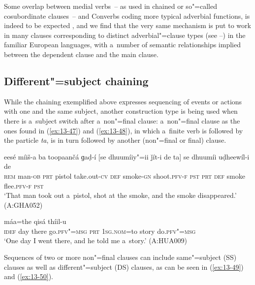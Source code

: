 Some overlap between medial verbs~-- as used in chained or so"=called cosubordinate clauses~-- and Converbs coding more typical adverbial functions, is indeed to be expected \citep[26]{haspelmath1995}, and we find that the very same mechanism is put to work in many clauses corresponding to distinct adverbial"=clause types (see --) in the familiar European languages, with a~number of semantic relationships implied between the dependent clause and the main clause. 


\subsection{Different"=subject chaining}
\label{subsec:13-3-2}


While the chaining exemplified above expresses sequencing of events or actions with one and the same subject, another construction type is being used when there is a~subject switch after a~non"=final clause: a~non"=final clause as the ones found in (\ref{ex:13-47}) and (\ref{ex:13-48}), in which a~finite verb is followed by the particle \textit{ta}, is in turn followed by another (non"=final or final) clause.

\begin{exe}
\ex
\label{ex:13-47}
\gll eesé míiš-a ba toopaančá ɡaḍ-í [se dhuumíiy"=ii ǰít-i de ta] se dhuumíi uḍheewíl-i de \\
\textsc{rem} man-\textsc{ob} \textsc{prt} pistol take.out-\textsc{cv} \textsc{def}  smoke-\textsc{gn} shoot.\textsc{pfv-f} \textsc{pst} \textsc{prt} \textsc{def} smoke flee.\textsc{pfv-f} \textsc{pst} \\
\glt `That man took out a~pistol, shot at the smoke, and the smoke disappeared.' (A:GHA052)

\ex
\label{ex:13-48}
 máa=the qisá thíil-u \\
\textsc{idef} day there go.\textsc{pfv"=msg } \textsc{prt} \textsc{1sg.nom}=to story do.\textsc{pfv"=msg}  \\
\glt `One day I went there, and he told me a~story.' (A:HUA009) 
\end{exe}

Sequences of two or more non"=final clauses can include same"=subject (SS) clauses as well as different"=subject (DS) clauses, as can be seen in (\ref{ex:13-49}) and (\ref{ex:13-50}).

